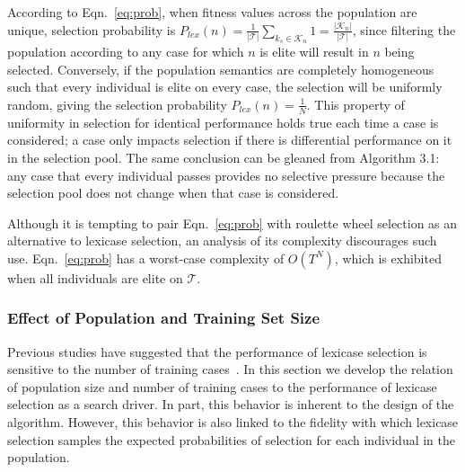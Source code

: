 \documentclass[twoside]{article}
\begin{document}
According to Eqn.~\ref{eq:prob}, when fitness values across the population are unique, selection probability is $P_{lex}(n) = \frac{1}{|\mathcal{T}|} \sum_{k_s \in \mathcal{K}_n} 1 = \frac{|\mathcal{K}_n|}{|\mathcal{T}|}$, since filtering the population according to any case for which $n$ is elite will result in $n$ being selected. Conversely, if the population semantics are completely homogeneous such that every individual is elite on every case, the selection will be uniformly random, giving the selection probability $P_{lex}(n) = \frac{1}{N}$. This property of uniformity in selection for identical performance holds true each time a case is considered; a case only impacts selection if there is differential performance on it in the selection pool. The same conclusion can be gleaned from Algorithm 3.1: any case that every individual passes provides no selective pressure because the selection pool does not change when that case is considered.

Although it is tempting to pair Eqn.~\ref{eq:prob} with roulette wheel selection as an alternative to lexicase selection, an analysis of its complexity discourages such use. Eqn.~\ref{eq:prob} has a worst-case complexity of $O(T^N)$, which is exhibited when all individuals are elite on $\mathcal{T}$. 

 
\subsubsection{Effect of Population and Training Set Size}

Previous studies have suggested that the performance of lexicase selection is sensitive to the number of training cases~\citep{liskowski_comparison_2015}. In this section we develop the relation of population size and number of training cases to the performance of lexicase selection as a search driver. In part, this behavior is inherent to the design of the algorithm. However, this behavior is also linked to the fidelity with which lexicase selection samples the expected probabilities of selection for each individual in the population. 
\end{document}
